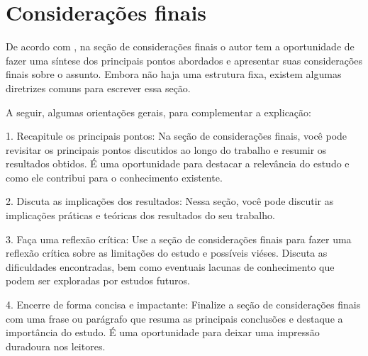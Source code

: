 \documentclass[
	article,			%
	12pt,				%
	oneside,			%
	a4paper,			%
    BIBLATEX,           %
	english,			%
	brazil,				%
	sumario=tradicional
	]{abntex2}
\begin{document}
\section{Considerações finais}


De acordo com , na seção de considerações finais o autor tem a oportunidade de fazer uma síntese dos principais pontos abordados e apresentar suas considerações finais sobre o assunto. Embora não haja uma estrutura fixa, existem algumas diretrizes comuns para escrever essa seção.

A seguir, algumas orientações gerais, para complementar a explicação:

1. Recapitule os principais pontos: Na seção de considerações finais, você pode revisitar os principais pontos discutidos ao longo do trabalho e resumir os resultados obtidos. É uma oportunidade para destacar a relevância do estudo e como ele contribui para o conhecimento existente.

2. Discuta as implicações dos resultados: Nessa seção, você pode discutir as implicações práticas e teóricas dos resultados do seu trabalho. 

3. Faça uma reflexão crítica: Use a seção de considerações finais para fazer uma reflexão crítica sobre as limitações do estudo e possíveis viéses. Discuta as dificuldades encontradas, bem como eventuais lacunas de conhecimento que podem ser exploradas por estudos futuros.

4. Encerre de forma concisa e impactante: Finalize a seção de considerações finais com uma frase ou parágrafo que resuma as principais conclusões e destaque a importância do estudo. É uma oportunidade para deixar uma impressão duradoura nos leitores.

\postextual


%
%
\end{document}
